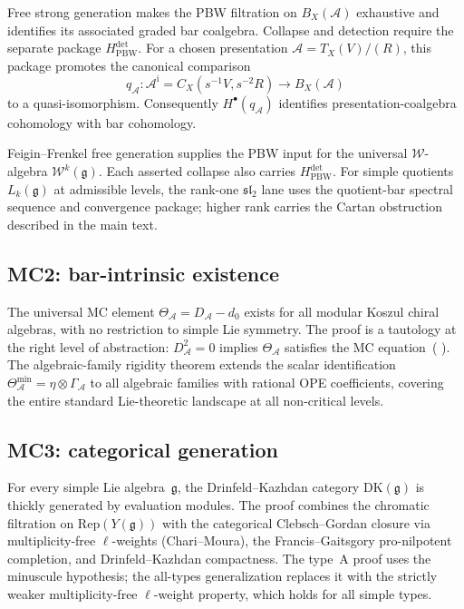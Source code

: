 \documentclass[11pt,reqno]{amsart}
\makeatletter
\theoremstyle{definition}
\theoremstyle{remark}
\providecommand{\cA}{\mathcal{A}}
\providecommand{\cW}{\mathcal{W}}
\providecommand{\fg}{\mathfrak{g}}
\numberwithin{equation}{section}
\let\ps@oldref\ref
\renewcommand{\ref}[1]{%
 \@ifundefined{r@#1}{\textit{full monograph}}{\ps@oldref{#1}}%
}
\makeatother
\begin{document}
Free strong generation makes the PBW filtration on $B_X(\cA)$
exhaustive and identifies its associated graded bar coalgebra.
Collapse and detection require the separate package
$H_{\mathrm{PBW}}^{\mathrm{det}}$.  For a chosen presentation
$\cA=T_X(V)/(R)$, this package promotes the canonical comparison
\[
q_\cA\colon
\cA^{\mathrm i}=C_X(s^{-1}V,s^{-2}R)
\longrightarrow B_X(\cA)
\]
to a quasi-isomorphism.  Consequently $H^\bullet(q_\cA)$ identifies
presentation-coalgebra cohomology with bar cohomology.

Feigin--Frenkel free generation supplies the PBW input for the
universal $\cW$-algebra $\cW^k(\fg)$.  Each asserted collapse also
carries $H_{\mathrm{PBW}}^{\mathrm{det}}$.  For simple quotients
$L_k(\fg)$ at admissible levels, the rank-one $\mathfrak{sl}_2$ lane
uses the quotient-bar spectral sequence and convergence package;
higher rank carries the Cartan obstruction described in the main
text.

\subsection{MC2: bar-intrinsic existence}
\label{ssec:mc2}

The universal MC element $\Theta_\cA = D_\cA - d_0$
exists for all modular Koszul chiral algebras, with no
restriction to simple Lie symmetry. The proof is a
tautology at the right level of abstraction: $D_\cA^2 = 0$
implies $\Theta_\cA$ satisfies the MC
equation~(\ref{eq:mc-equation}). The algebraic-family
rigidity theorem extends the scalar identification
$\Theta_\cA^{\min} = \eta \otimes \Gamma_\cA$ to all
algebraic families with rational OPE coefficients, covering
the entire standard Lie-theoretic landscape at all
non-critical levels.

\subsection{MC3: categorical generation}
\label{ssec:mc3}

For every simple Lie algebra~$\fg$, the Drinfeld--Kazhdan
category $\mathrm{DK}(\fg)$ is thickly generated by
evaluation modules. The proof combines the chromatic
filtration on $\mathrm{Rep}(Y(\fg))$ with the categorical
Clebsch--Gordan closure via multiplicity-free
$\ell$-weights (Chari--Moura), the Francis--Gaitsgory
pro-nilpotent completion, and Drinfeld--Kazhdan
compactness. The type~A proof uses the minuscule
hypothesis; the all-types generalization replaces it with
the strictly weaker multiplicity-free $\ell$-weight
property, which holds for all simple types.
\end{document}
